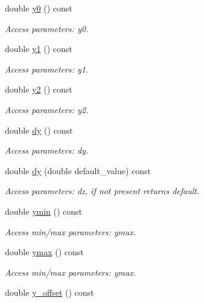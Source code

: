 \begin{DoxyCompactItemize}
double \hyperlink{struct_d_d4hep_1_1_x_m_l_1_1_child_value_a904e9922ce31589f22a3050566a240da}{y0} () const
\begin{DoxyCompactList}\small\item\em Access parameters\+: y0. \end{DoxyCompactList}\item 
double \hyperlink{struct_d_d4hep_1_1_x_m_l_1_1_child_value_a1ad5890374ce575719bb7571f41d1b7e}{y1} () const
\begin{DoxyCompactList}\small\item\em Access parameters\+: y1. \end{DoxyCompactList}\item 
double \hyperlink{struct_d_d4hep_1_1_x_m_l_1_1_child_value_a0418217990ece3a5ed4a67f302faff73}{y2} () const
\begin{DoxyCompactList}\small\item\em Access parameters\+: y2. \end{DoxyCompactList}\item 
double \hyperlink{struct_d_d4hep_1_1_x_m_l_1_1_child_value_ace7f59799d67b2706691a2f79019f7bf}{dy} () const
\begin{DoxyCompactList}\small\item\em Access parameters\+: dy. \end{DoxyCompactList}\item 
double \hyperlink{struct_d_d4hep_1_1_x_m_l_1_1_child_value_a532be6cbe2e5827d8b65b63dadf97fc4}{dy} (double default\+\_\+value) const
\begin{DoxyCompactList}\small\item\em Access parameters\+: dz, if not present returns default. \end{DoxyCompactList}\item 
double \hyperlink{struct_d_d4hep_1_1_x_m_l_1_1_child_value_abd40926ea84fc05c74326a2642a0ae87}{ymin} () const
\begin{DoxyCompactList}\small\item\em Access min/max parameters\+: ymax. \end{DoxyCompactList}\item 
double \hyperlink{struct_d_d4hep_1_1_x_m_l_1_1_child_value_abfc209b8c7a38f5625b0e32710391bb6}{ymax} () const
\begin{DoxyCompactList}\small\item\em Access min/max parameters\+: ymax. \end{DoxyCompactList}\item 
double \hyperlink{struct_d_d4hep_1_1_x_m_l_1_1_child_value_a6b235494c67254eec16ecac5d8bdbf70}{y\+\_\+offset} () const

\end{DoxyCompactItemize}
